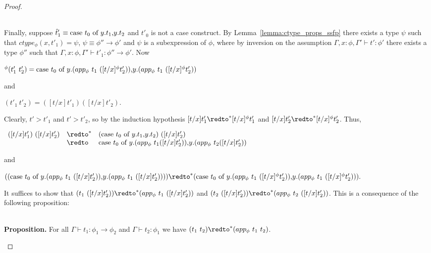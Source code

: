 \begin{proof}
\begin{itemize}
  \ \\
  Finally, suppose $\hat{t}'_1 \equiv \mbox{case}\ t_0\ \text{of}\ y\text{.}t_1\text{,}y\text{.}t_2$ and $t'_0$ is not a case construct.  By Lemma~\ref{lemma:ctype_props_ssfp}
  there exists a type $\psi$ such that $ctype_\phi(x,t'_1) = \psi$, $\psi \equiv \phi'' \to \phi'$ and $\psi$ is a subexpression
  of $\phi$, where by inversion on the assumption $\Gamma,x:\phi,\Gamma' \vdash t':\phi'$ there exists a type $\phi''$ such that
  $\Gamma,x:\phi,\Gamma' \vdash t'_1:\phi'' \to \phi'$.  Now 
  \begin{center}
    \begin{math}
      [t/x]^\phi (t'_1\ t'_2) = \ccon{t_0}{y}{(app_\phi\ t_1\ ([t/x]^\phi t'_2))}{(app_\phi\ t_1\ ([t/x]^\phi t'_2))}
    \end{math}
  \end{center}
  and
  \begin{center}
    \begin{math}
      [t/x](t'_1\ t'_2) = ([t/x]t'_1)([t/x]t'_2).
    \end{math}
  \end{center}
  Clearly, $t' > t'_1$ and $t' > t'_2$, so by the induction hypothesis $[t/x]t'_1 \redto^* [t/x]^\phi t'_1$ and $[t/x]t'_2 \redto^* [t/x]^\phi t'_2$.  Thus,
  \begin{center}
    \begin{math}
      \begin{array}{lll}
        ([t/x]t'_1)\ ([t/x]t'_2) & \redto^* & (\ccon{t_0}{y}{t_1}{t_2})\ ([t/x]t'_2)\\
        & \redto & \ccon{t_0}{y}{(app_\phi\ t_1 ([t/x]t'_2))}{(app_\phi\ t_2 ([t/x]t'_2))}
      \end{array}
    \end{math}
  \end{center}
  and
  \begin{center}
    \begin{math}
      ((\ccon{t_0}{y}{(app_\phi\ t_1\ ([t/x] t'_2))}{(app_\phi\ t_1\ ([t/x] t'_2))})) \redto^* (\ccon{t_0}{y}{(app_\phi\ t_1\ ([t/x]^\phi t'_2))}{(app_\phi\ t_1\ ([t/x]^\phi t'_2))}).
    \end{math}
  \end{center}
  It suffices to show that $(t_1\ ([t/x] t'_2)) \redto^* (app_\phi\ t_1\ ([t/x] t'_2))$ and 
  $(t_2\ ([t/x] t'_2)) \redto^* (app_\phi\ t_2\ ([t/x] t'_2))$.  This is a consequence of the following proposition:
    
  \ \\
  {\bf Proposition.} For all $\Gamma \vdash t_1:\phi_1 \to \phi_2$ and $\Gamma \vdash t_2:\phi_1$ we have
  $(t_1\ t_2) \redto^* (app_\phi\ t_1\ t_2)$.
  

\end{itemize}
\end{proof}

